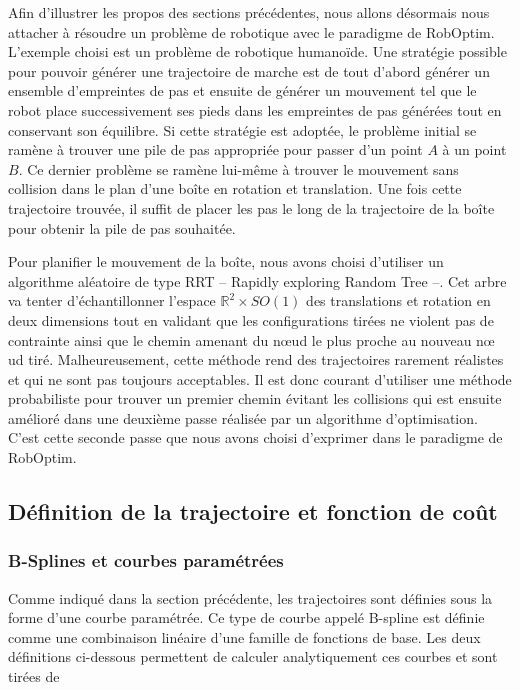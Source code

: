 Afin d'illustrer les propos des sections précédentes, nous allons
désormais nous attacher à résoudre un problème de robotique avec le
paradigme de RobOptim. L'exemple choisi est un problème de robotique
humanoïde. Une stratégie possible pour pouvoir générer une trajectoire
de marche est de tout d'abord générer un ensemble d'empreintes de pas
et ensuite de générer un mouvement tel que le robot place
successivement ses pieds dans les empreintes de pas générées tout en
conservant son équilibre. Si cette stratégie est adoptée, le problème
initial se ramène à trouver une pile de pas appropriée pour passer
d'un point $A$ à un point $B$. Ce dernier problème se ramène lui-même
à trouver le mouvement sans collision dans le plan d'une boîte en
rotation et translation. Une fois cette trajectoire trouvée, il suffit
de placer les pas le long de la trajectoire de la boîte pour obtenir
la pile de pas souhaitée.


Pour planifier le mouvement de la boîte, nous avons choisi d'utiliser
un algorithme aléatoire de type RRT -- Rapidly exploring Random Tree
--. Cet arbre va tenter d'échantillonner l'espace $\mathbb{R}^2 \times
SO(1)$ des translations et rotation en deux dimensions tout en
validant que les configurations tirées ne violent pas de contrainte
ainsi que le chemin amenant du n\oe ud le plus proche au nouveau n\oe
ud tiré. Malheureusement, cette méthode rend des trajectoires rarement
réalistes et qui ne sont pas toujours acceptables. Il est donc courant
d'utiliser une méthode probabiliste pour trouver un premier chemin
évitant les collisions qui est ensuite amélioré dans une deuxième
passe réalisée par un algorithme d'optimisation. C'est cette seconde
passe que nous avons choisi d'exprimer dans le paradigme de RobOptim.


\subsection{Définition de la trajectoire et fonction de coût}
\label{sec:chap1_roboptim_cout}

\subsubsection{B-Splines et courbes paramétrées}
\label{sec:chap1_roboptim_cout_bspline}

Comme indiqué dans la section précédente, les trajectoires sont
définies sous la forme d'une courbe paramétrée. Ce type de courbe
appelé B-spline est définie comme une
combinaison linéaire d'une famille de fonctions de base. Les deux
définitions ci-dessous permettent de calculer analytiquement ces
courbes et sont tirées de \citep{algo.3d}

